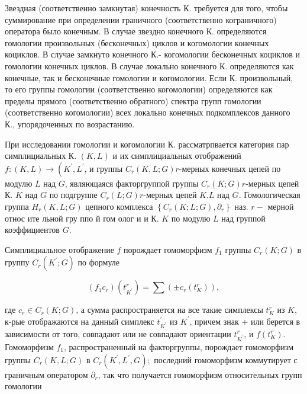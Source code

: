 \documentclass[10pt]{article}
\begin{document}
Звездная (соответственно замкнутая) конечность $К$. требуется для того, чтобы суммирование при определении граничного (соответственно кограничного) оператора было конечным. В случае звездно конечного $К$. определяются гомологии произвольных (бесконечных) циклов и когомологии конечных коциклов. В случае замкнуто конечного К.- когомологии бесконечных коциклов и гомологии конечных циклов. В случае локально конечного К. определяются как конечные, так и бесконечные гомологии и когомологии. Если К. произвольный, то его группы гомологии (соответственно когомологии) определяются как пределы прямого (соответственно обратного) спектра групп гомологии (соответственно когомологии) всех локально конечных подкомплексов данного К., упорядоченных по возрастанию.



При исследовании гомологии и когомологии К. рассматрпвается категория пар симплициальных К. $(K, L)$ и их симплициальных отображений $f:(K, L) \rightarrow\left(K^{\prime}, L^{\prime}\right.$, и группы $C_{r}(K, L ; G) r$-мерных конечных цепей по модулю $L$ над $G$, являющаяся факторгруппой группы $C_{r}(K ; G) r$-мерных цепей К. $K$ над $G$ по подгруппе $C_{r}(L ; G) r$-мерных цепей $K . L$ над $G$. Гомологическая группа $H_{r}(K, L ; G)$ цепного комплекса $\left\{C_{r}(K ; L ; G), \partial_{r}\right\}$ наз. $r-$ мерной относ ите льной гру ппо й гом олог и и К. $K$ по модулю $L$ над группой коэффициентов $G$.



Симплициальное отображение $f$ порождает гомоморфизм $f_{1}$ группы $C_{r}(K ; G)$ в группу $C_{r}\left(K^{\prime} ; G\right)$ по формуле



\[

\left(f_{1} c_{r}\right)\left(t_{K^{\prime}}^{r}\right)=\sum\left( \pm c_{r}\left(t_{K}^{r}\right)\right),

\]



где $c_{r} \in C_{r}(K ; G)$, а сумма распространяется на все такие симплексы $t_{K}^{r}$ из $K$, к-рые отображаются на данный симплекс $t_{K^{\prime}}^{\prime}$ из $K^{\prime}$, причем знак + или берется в зависимости от того, совпадают или не совпадают ориентации $t_{K^{\prime}}^{r}$, и $f\left(t_{K}^{r}\right)$. Гомоморфизм $f_{1}$, распространенный на факторгруппы, порождает гомоморфизм группы $C_{r}(K, L ; G)$ в $C_{r}\left(K^{\prime}, L^{\prime}, G\right) ;$ последний гомоморфизм коммутирует с граничным оператором $\partial_{r}$, так что получается гомоморфизм относительных групп гомологии
\end{document}
